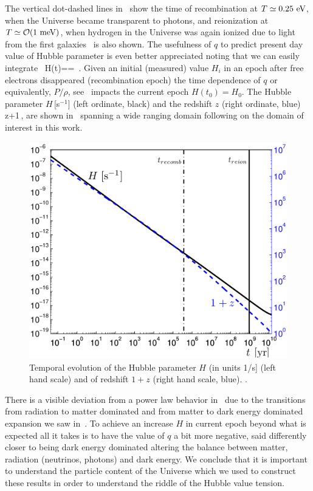 The vertical dot-dashed lines in~ show the time of recombination at $T\simeq0.25\text{ eV}$, when the Universe became transparent to photons, and reionization at $T\simeq {\cal O}(1\meV)$, when hydrogen in the Universe was again ionized due to light from the first galaxies~\cite{Zaroubi:2012in} is also shown. The usefulness of $q$ to predict present day value of Hubble parameter is even better appreciated noting that we can easily integrate~ 
\beqn\label{eq:HdotInt}
H(t)==
\,.
\eeqn
Given an initial (measured) value $H_i$ in an epoch after free electrons disappeared (recombination epoch) the time dependence of $q$ or equivalently, $P/\rho$, see~ impacts the current epoch $H(t_0)=H_0$. The Hubble parameter 
$H$\,[s$^{-1}$] (left ordinate, black) and the redshift $z$ (right ordinate, blue) 
\beqn\label{eq:zdef}
z+1\equiv {}\,,
\eeqn
are shown in~ spanning a wide ranging domain following on the domain of interest in this work. 

\begin{figure}
\centerline{\includegraphics[width=0.90\linewidth]{01-introduction/Figures/Hztoday.png}}
\caption{Temporal evolution of the Hubble parameter $H$ (in units 1/s] (left hand scale) and of redshift $1+z$ (right hand scale, blue). . 
\label{fig:today1} }
\end{figure}


There is a visible deviation from a power law behavior in~ due to the transitions from radiation to matter dominated and from matter to dark energy dominated expansion we saw in~. To achieve an increase $H$ in current epoch beyond what is expected all it takes is to have the value of $q$ a bit more negative, said differently closer to being dark energy dominated altering the balance between matter, radiation (neutrinos, photons) and dark energy. We conclude that it is important to understand the particle content of the Universe which we used to construct these results in order to understand the riddle of the Hubble value tension.

